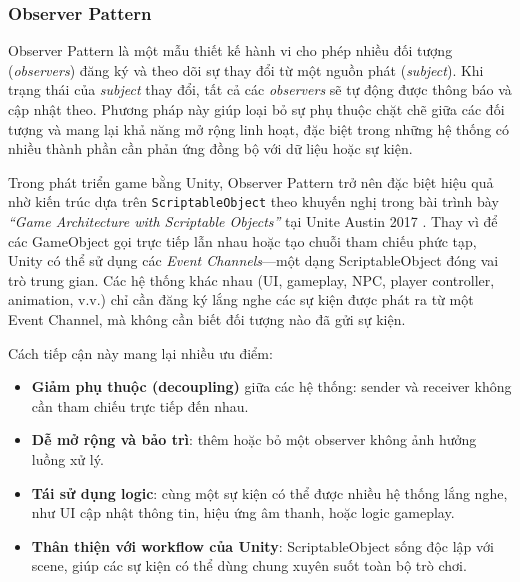 
\subsubsection{Observer Pattern}

Observer Pattern là một mẫu thiết kế hành vi cho phép nhiều đối tượng (\textit{observers}) đăng ký và theo dõi sự thay đổi từ một nguồn phát (\textit{subject}). Khi trạng thái của \textit{subject} thay đổi, tất cả các \textit{observers} sẽ tự động được thông báo và cập nhật theo. Phương pháp này giúp loại bỏ sự phụ thuộc chặt chẽ giữa các đối tượng và mang lại khả năng mở rộng linh hoạt, đặc biệt trong những hệ thống có nhiều thành phần cần phản ứng đồng bộ với dữ liệu hoặc sự kiện.

Trong phát triển game bằng Unity, Observer Pattern trở nên đặc biệt hiệu quả nhờ kiến trúc dựa trên \texttt{ScriptableObject} theo khuyến nghị trong bài trình bày \textit{“Game Architecture with Scriptable Objects”} tại Unite Austin 2017 \cite{hipple2017}. Thay vì để các GameObject gọi trực tiếp lẫn nhau hoặc tạo chuỗi tham chiếu phức tạp, Unity có thể sử dụng các \textit{Event Channels}—một dạng ScriptableObject đóng vai trò trung gian. Các hệ thống khác nhau (UI, gameplay, NPC, player controller, animation, v.v.) chỉ cần đăng ký lắng nghe các sự kiện được phát ra từ một Event Channel, mà không cần biết đối tượng nào đã gửi sự kiện.

Cách tiếp cận này mang lại nhiều ưu điểm:
\begin{itemize}
    \item \textbf{Giảm phụ thuộc (decoupling)} giữa các hệ thống: sender và receiver không cần tham chiếu trực tiếp đến nhau.
    \item \textbf{Dễ mở rộng và bảo trì}: thêm hoặc bỏ một observer không ảnh hưởng luồng xử lý.
    \item \textbf{Tái sử dụng logic}: cùng một sự kiện có thể được nhiều hệ thống lắng nghe, như UI cập nhật thông tin, hiệu ứng âm thanh, hoặc logic gameplay.
    \item \textbf{Thân thiện với workflow của Unity}: ScriptableObject sống độc lập với scene, giúp các sự kiện có thể dùng chung xuyên suốt toàn bộ trò chơi.
\end{itemize}

